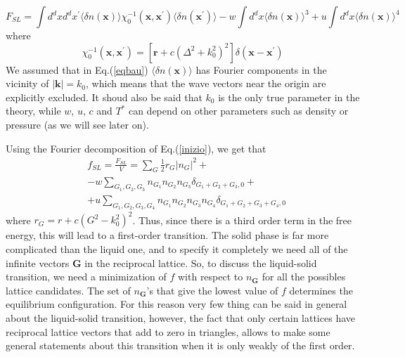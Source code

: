 \documentclass[12pt,a4paper]{article}
\begin{document}
\begin{equation} \label{eqbau}
F_{SL} = \int d^d x d^d x^\prime  \langle \delta n(\textbf{x})\rangle \chi^{-1}_{0}( \textbf{x} ,\textbf{x} ^\prime) \langle \delta n(\textbf{x}^\prime)\rangle - w \int d^d x \langle \delta n(\textbf{x})\rangle ^3 + u \int d^d x \langle \delta n(\textbf{x})\rangle ^4
\end{equation}
 where
\begin{equation}
\chi^{-1}_{0}( \textbf{x} ,\textbf{x} ^\prime) = [ \textbf{r} + c(\Delta ^2 + k^2_0)^2] \delta(\textbf{x} - \textbf{x} ^\prime)
\end{equation}
We assumed that in Eq.(\ref{eqbau}) $\langle \delta n(\textbf{x})\rangle$ has Fourier components in the vicinity of $|\textbf{k}| = k_0$, which means that the wave vectors near the origin are explicitly excluded. It shoud also be said that $k_0$ is the only true parameter in the theory, while $w$, $u$, $c$ and $T^*$ can depend on other parameters such as density or pressure (as we will see later on). 

Using the Fourier decomposition of Eq.(\ref{inizio}), we get that
\begin{equation}
\begin{split}
&f_{SL} = \frac{F_{SL}}{V} = \sum_{G} \frac{1}{2}r_{G}|n_{G}|^2 + \\ &- w\sum_{G_1,G_2,G_3} n_{G_1}n_{G_2}n_{G_3}\delta_{G_1+G_2+G_3,0}+\\&+ u\sum_{G_1,G_2,G_3,G_4} n_{G_1}n_{G_2}n_{G_3}n_{G_4}\delta_{G_1+G_2+G_3+G_4,0}
\end{split}
\end{equation}
where $r_{G} = r + c(G^2 - k^2_0)^2$.
\newline
Thus, since there is a third order term in the free energy, this will lead to a first-order transition. The solid phase is far more complicated than the liquid one, and to specify it completely we need all of the infinite vectors $\textbf{G}$ in the reciprocal lattice. So, to discuss the liquid-solid transition, we need a minimization of $f$ with respect to $n_{\textbf{G}}$ for all the possibles lattice candidates. The set of $n_{\textbf{G}}$'s that give the lowest value of $f$ determines the equilibrium configuration. For this reason very few thing can be said in general about the liquid-solid transition, however, the fact that only certain lattices have reciprocal lattice vectors that add to zero in triangles, allows to make some general statements about this transition when it is only weakly of the first order.
\end{document}
